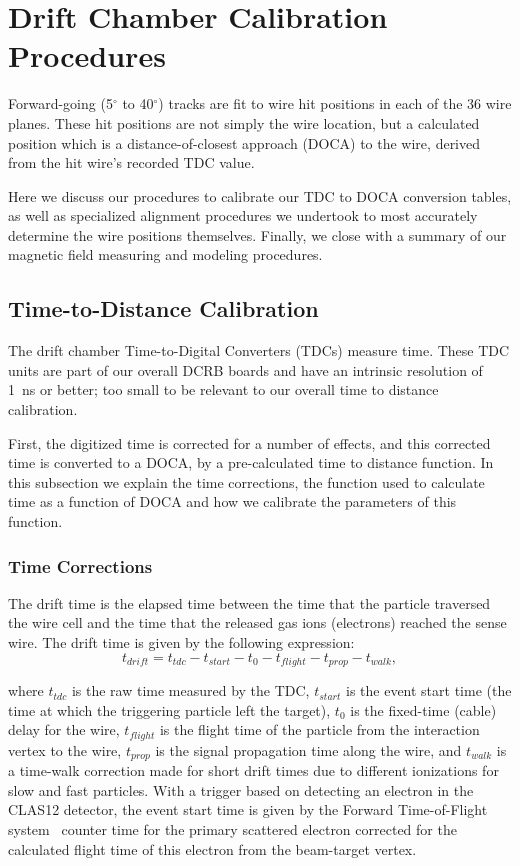 \section{Drift Chamber Calibration Procedures}
\label{calibration}

Forward-going (5$^{\circ}$ to 40$^{\circ}$) tracks are fit to
wire hit positions in each of the 36 wire planes.  These
hit positions are not simply the wire location, but 
a calculated position which is a distance-of-closest approach (DOCA)
to the wire, derived from the hit wire's recorded TDC value.  

Here we discuss our procedures to calibrate our TDC to DOCA conversion
tables, as well as specialized alignment procedures we undertook
to most accurately determine the wire positions themselves.
Finally, we close with a summary of our magnetic field measuring
and modeling procedures.

\subsection{Time-to-Distance Calibration}

The drift chamber Time-to-Digital Converters (TDCs) measure time.  
These TDC units are part of our overall DCRB boards and
have an intrinsic resolution of 1~ns or better; too small to be relevant to
our overall time to distance calibration.

First, the digitized time is corrected for a number of effects, and this corrected time is converted
to a DOCA, by a pre-calculated time to distance function.  In this subsection we 
explain the time corrections, the function used to calculate time as a 
function of DOCA and how we calibrate the parameters of this function.

\subsubsection{Time Corrections}

The drift time is the elapsed time between the time that the particle 
traversed the wire cell and the time that the released gas ions (electrons)
reached the sense wire.
The drift time is given by the following expression:
\begin{equation} 
\label{tdrift}
t_{drift} = t_{tdc} - t_{start} - t_{0} - t_{flight} - t_{prop} - t_{walk},
\end{equation}

\noindent
where $t_{tdc}$ is the raw time measured by the TDC, $t_{start}$ is the event start time (the time at which
the triggering particle left the target),  $t_0$ is the fixed-time (cable) delay for the wire, $t_{flight}$ is the 
flight time of the particle from the interaction vertex to the wire, $t_{prop}$ 
is the signal propagation time along the wire, and $t_{walk}$ is a time-walk 
correction made for short drift times due to different ionizations for slow and fast particles.  
With a trigger based on detecting an electron in the CLAS12 detector, the event start time is 
given by the Forward Time-of-Flight system~\cite{ftof-nim} counter time for the primary scattered
electron corrected for the calculated flight time of this electron from the beam-target vertex.


